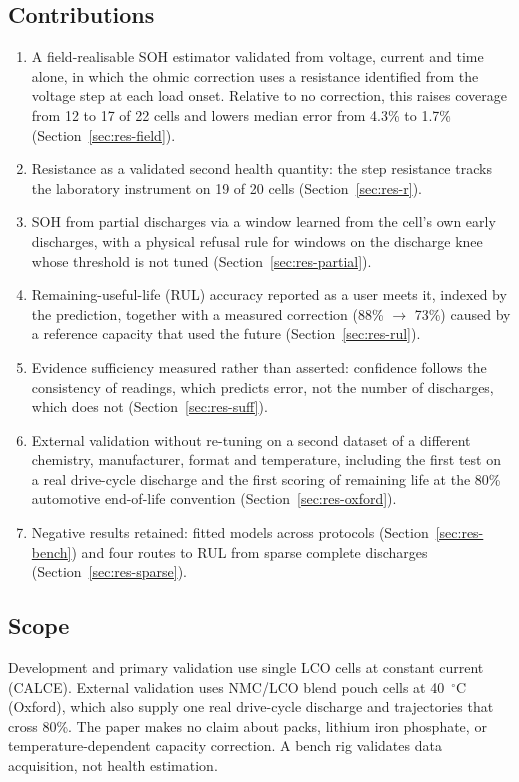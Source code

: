 \documentclass[preprint,12pt,authoryear]{elsarticle}
\begin{document}
\subsection{Contributions}
\begin{enumerate}
\item A field-realisable SOH estimator validated from voltage, current and time
alone, in which the ohmic correction uses a resistance identified from the
voltage step at each load onset. Relative to no correction, this raises
coverage from 12 to 17 of 22 cells and lowers median error from 4.3\% to
1.7\% (Section~\ref{sec:res-field}).
\item Resistance as a validated second health quantity: the step resistance
tracks the laboratory instrument on 19 of 20 cells (Section~\ref{sec:res-r}).
\item SOH from partial discharges via a window learned from the cell's own early
discharges, with a physical refusal rule for windows on the discharge knee whose
threshold is not tuned (Section~\ref{sec:res-partial}).
\item Remaining-useful-life (RUL) accuracy reported as a user meets it, indexed
by the prediction, together with a measured correction (88\% $\to$ 73\%) caused
by a reference capacity that used the future (Section~\ref{sec:res-rul}).
\item Evidence sufficiency measured rather than asserted: confidence follows the
consistency of readings, which predicts error, not the number of discharges,
which does not (Section~\ref{sec:res-suff}).
\item External validation without re-tuning on a second dataset of a
different chemistry, manufacturer, format and temperature, including the first
test on a real drive-cycle discharge and the first scoring of remaining life at
the 80\% automotive end-of-life convention (Section~\ref{sec:res-oxford}).
\item Negative results retained: fitted models across protocols
(Section~\ref{sec:res-bench}) and four routes to RUL from sparse complete
discharges (Section~\ref{sec:res-sparse}).
\end{enumerate}

\subsection{Scope}
Development and primary validation use single LCO cells at constant current
(CALCE). External validation uses NMC/LCO blend pouch cells at 40~$^\circ$C
(Oxford), which also supply one real drive-cycle discharge and trajectories
that cross 80\%. The paper makes no claim about packs, lithium iron phosphate,
or temperature-dependent capacity correction. A bench rig validates data acquisition, not health
estimation.
\end{document}
